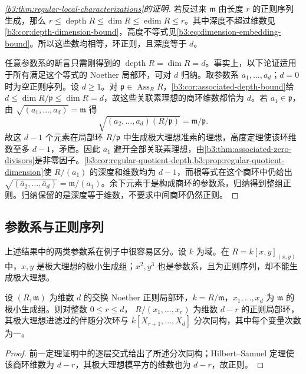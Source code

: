 \begin{proof}[\cref{b3:thm:regular-local-characterizations}的证明]
	若反过来 \(\mathfrak m\) 由长度 \(r\) 的正则序列生成，那么 \(r\le\operatorname{depth}R\le\dim R\le\operatorname{edim}R\le r\)。其中深度不超过维数见\cref{b3:cor:depth-dimension-bound}，高度不等式见\eqref{b3:eq:dimension-embedding-bound}。所以这些数均相等，环正则，且深度等于 \(d\)。

	任意参数系的断言只需刚得到的 \(\operatorname{depth}R=\dim R=d\)。事实上，以下论证适用于所有满足这个等式的 Noether 局部环，可对 \(d\) 归纳。取参数系 \(a_1,\ldots,a_d\)；\(d=0\) 时为空正则序列。设 \(d\ge1\)。对 \(\mathfrak p\in\operatorname{Ass}_RR\)，\cref{b3:cor:associated-depth-bound}给 \(d\le\dim R/\mathfrak p\le\dim R=d\)，故这些关联素理想的商环维数都恰为 \(d\)。若 \(a_1\in\mathfrak p\)，由 \(\sqrt{(a_1,\ldots,a_d)}=\mathfrak m\) 得
	\[
		\sqrt{(a_2,\ldots,a_d)(R/\mathfrak p)} =\mathfrak m/\mathfrak p.
	\]
	故这 \(d-1\) 个元素在局部环 \(R/\mathfrak p\) 中生成极大理想准素的理想，高度定理使该环维数至多 \(d-1\)，矛盾。因此 \(a_1\) 避开全部关联素理想，由\cref{b3:thm:associated-zero-divisors}是非零因子。\cref{b3:cor:regular-quotient-depth,b3:prop:regular-quotient-dimension}使 \(R/(a_1)\) 的深度和维数均为 \(d-1\)，而根等式在这个商环中仍给出 \(\sqrt{(\bar a_2,\ldots,\bar a_d)}=\mathfrak m/(a_1)\)。余下元素于是构成商环的参数系，归纳得到整组正则。归纳保留的是深度等于维数，不要求中间商环仍然正则。
\end{proof}

\subsection{参数系与正则序列}
\label{b3:subsec:1801:03}

上述结果中的两类参数系在例子中很容易区分。设 \(k\) 为域。在 \(R=k[x,y]_{(x,y)}\) 中，\(x,y\) 是极大理想的极小生成组；\(x^2,y^3\) 也是参数系，且为正则序列，却不能生成极大理想。

\begin{corollary}\label{b3:cor:regular-parameter-quotient}
	设 \((R,\mathfrak m)\) 为维数 \(d\) 的交换 Noether 正则局部环，\(k=R/\mathfrak m\)，\(x_1,\ldots,x_d\) 为 \(\mathfrak m\) 的极小生成组。则对整数 \(0\le r\le d\)， \(R/(x_1,\ldots,x_r)\) 为维数 \(d-r\) 的正则局部环，其极大理想进滤过的伴随分次环与 \(k[X_{r+1},\ldots,X_d]\) 分次同构，其中每个变量次数为一。
\end{corollary}
\begin{proof}
	前一定理证明中的逐层交式给出了所述分次同构；Hilbert–Samuel 定理使该商环维数为 \(d-r\)，其极大理想模平方的维数也为 \(d-r\)，故正则。
\end{proof}

